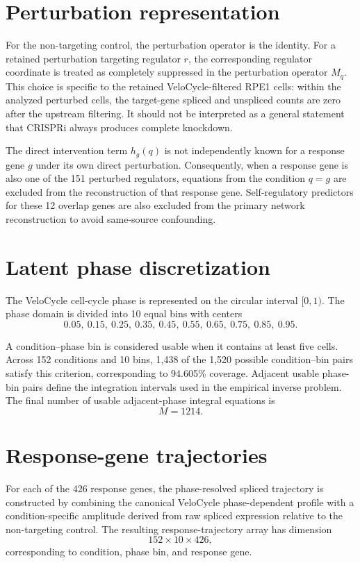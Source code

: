 \documentclass[supplement,onefignum,onetabnum]{siamart251216}
\begin{document}
\section{Perturbation representation}

For the non-targeting control, the perturbation operator is the identity. For a retained perturbation targeting regulator \(r\), the corresponding regulator coordinate is treated as completely suppressed in the perturbation operator \(M_q\). This choice is specific to the retained VeloCycle-filtered RPE1 cells: within the analyzed perturbed cells, the target-gene spliced and unspliced counts are zero after the upstream filtering. It should not be interpreted as a general statement that CRISPRi always produces complete knockdown.

The direct intervention term \(h_g(q)\) is not independently known for a response gene \(g\) under its own direct perturbation. Consequently, when a response gene is also one of the 151 perturbed regulators, equations from the condition \(q=g\) are excluded from the reconstruction of that response gene. Self-regulatory predictors for these 12 overlap genes are also excluded from the primary network reconstruction to avoid same-source confounding.

\section{Latent phase discretization}

The VeloCycle cell-cycle phase is represented on the circular interval \([0,1)\). The phase domain is divided into 10 equal bins with centers
\[
0.05,\ 0.15,\ 0.25,\ 0.35,\ 0.45,\ 0.55,\ 0.65,\ 0.75,\ 0.85,\ 0.95.
\]

A condition--phase bin is considered usable when it contains at least five cells. Across 152 conditions and 10 bins, 1,438 of the 1,520 possible condition--bin pairs satisfy this criterion, corresponding to 94.605\% coverage. Adjacent usable phase-bin pairs define the integration intervals used in the empirical inverse problem. The final number of usable adjacent-phase integral equations is
\[
M=1214.
\]

\section{Response-gene trajectories}

For each of the 426 response genes, the phase-resolved spliced trajectory is constructed by combining the canonical VeloCycle phase-dependent profile with a condition-specific amplitude derived from raw spliced expression relative to the non-targeting control. The resulting response-trajectory array has dimension
\[
152\times10\times426,
\]
corresponding to condition, phase bin, and response gene.
\end{document}
